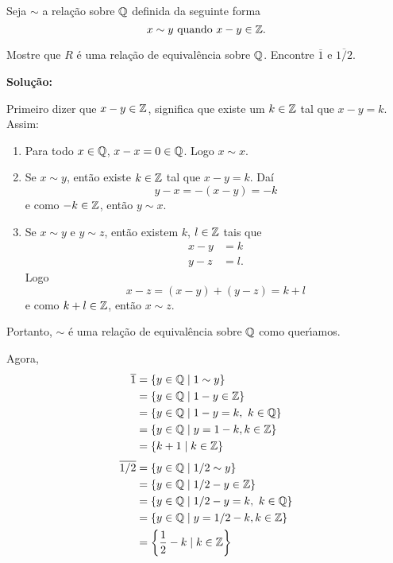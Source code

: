 \documentclass[12pt]{exam}
\begin{document}
\vspace{.5cm}

\questao Seja $\sim$ a relação sobre $\mathbb{Q}$ definida da seguinte forma
\[
	x\sim y \mbox{ quando } x - y \in \mathbb{Z}.
\]

Mostre que $R$ \'e uma rela{\c c}{\~a}o de equival{\^e}ncia sobre $\mathbb{Q}$. Encontre $\overline{1}$ e $\overline{1/2}$.


\noindent\textbf{Solu\c{c}\~ao:}

Primeiro dizer que $x - y \in \mathbb{Z}$, significa que existe um $k \in \mathbb{Z}$ tal que $x - y = k$. Assim:
\begin{enumerate}
	\item Para todo $x \in \mathbb{Q}$, $x - x = 0 \in \mathbb{Q}$. Logo $x \sim x$.
	\item Se $x \sim y$, então existe $k \in \mathbb{Z}$ tal que $x - y = k$. Daí
	\[
		y - x = -(x - y) = -k
	\]
	e como $-k \in \mathbb{Z}$, então $y \sim x$.
	\item Se $x \sim y$ e $y \sim z$, então existem $k$, $l \in \mathbb{Z}$ tais que
	\begin{align*}
		x - y &= k\\
		y - z &= l.
	\end{align*}
	Logo
	\[
		x - z = (x - y) + (y - z) = k + l
	\]
	e como $k + l \in \mathbb{Z}$, então $x \sim z$.
\end{enumerate}

Portanto, $\sim$ \'e uma rela\c{c}\~ao de equival\^encia sobre $\mathbb{Q}$ como quer{\'\i}amos.

Agora,
\begin{align*}
	\overline{1} &= \{y \in \mathbb{Q} \mid 1 \sim y\} \\&= \{y \in \mathbb{Q} \mid 1 - y \in \mathbb{Z}\} \\&= \{y \in \mathbb{Q} \mid 1 - y = k,\ k \in \mathbb{Q}\}\\&= \{y \in \mathbb{Q} \mid y = 1 - k, k \in \mathbb{Z}\} \\&= \{k + 1 \mid k \in \mathbb{Z}\}
\end{align*}
\begin{align*}
	\overline{1/2} &= \{y \in \rac \mid 1/2 \sim y\} \\&= \{y \in \rac \mid 1/2 - y \in \z\} \\&= \{y \in \rac \mid 1/2 - y = k,\ k \in \rac\} \\&= \{y \in \rac \mid y = 1/2 - k, k \in \z\} \\&= \left\{\dfrac{1}{2} - k \mid k \in \z\right\}
\end{align*}
\end{document}
